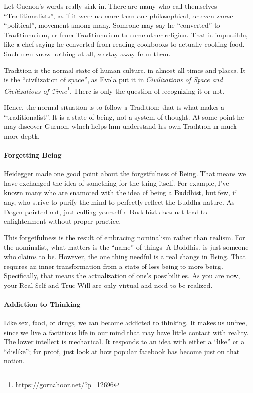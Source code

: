Let Guenon's words really sink in. There are many who call themselves ``Traditionalists'', as if it were no more than one philosophical, or even worse ``political'', movement among many. Someone may say he ``converted'' to Traditionalism, or from Traditionalism to some other religion. That is impossible, like a chef saying he converted from reading cookbooks to actually cooking food. Such men know nothing at all, so stay away from them.

Tradition is the normal state of human culture, in almost all times and places. It is the ``civilization of space'', as Evola put it in \textit{Civilizations of Space and Civilizations of Time}\footnote{\url{https://gornahoor.net/?p=12696}}. There is only the question of recognizing it or not.

Hence, the normal situation is to follow a Tradition; that is what makes a ``traditionalist''. It is a state of being, not a system of thought. At some point he may discover Guenon, which helps him understand his own Tradition in much more depth.

\paragraph{Forgetting Being}


Heidegger made one good point about the forgetfulness of Being. That means we have exchanged the idea of something for the thing itself. For example, I've known many who are enamored with the idea of being a Buddhist, but few, if any, who strive to purify the mind to perfectly reflect the Buddha nature. As Dogen pointed out, just calling yourself a Buddhist does not lead to enlightenment without proper practice.

This forgetfulness is the result of embracing nominalism rather than realism. For the nominalist, what matters is the ``name'' of things. A Buddhist is just someone who claims to be. However, the one thing needful is a real change in Being. That requires an inner transformation from a state of less being to more being. Specifically, that means the actualization of one's possibilities. As you are now, your Real Self and True Will are only virtual and need to be realized.

\paragraph{Addiction to Thinking}


Like sex, food, or drugs, we can become addicted to thinking. It makes us unfree, since we live a factitious life in our mind that may have little contact with reality. The lower intellect is mechanical. It responds to an idea with either a ``like'' or a ``dislike''; for proof, just look at how popular facebook has become just on that notion.

